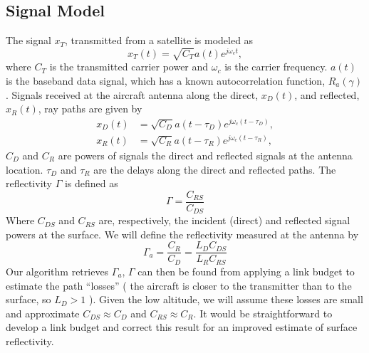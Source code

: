 \documentclass[draftcls,onecolumn]{IEEEtran}  %
\begin{document}
\subsection{Signal Model}
The  signal $x_{T}$, transmitted from a satellite is modeled as
\begin{equation}
	x_T(t)=\sqrt{C_T}a(t)e^{j\omega_et},
    \label{Eq:xT}
\end{equation}
where  $C_{T}$ is the transmitted carrier power and $\omega_{c}$ is the  carrier frequency. %
$a(t)$ is  the baseband data signal, which has  a known autocorrelation  function, $R_a(\gamma)$. 
Signals received at the aircraft antenna   along the direct, $x_D(t)$, and reflected, $x_R(t)$,  ray paths are given by 
\begin{eqnarray}
  	x_D(t)&=\sqrt{C_D}a(t-\tau_D)e^{j\omega_c (t-\tau_D)}, \\
    x_R(t)&=\sqrt{C_R}a(t-\tau_R)e^{j\omega_c (t-\tau_R)}, 
    \label{Eq:xD_xR}
\end{eqnarray}
 $C_D$ and $C_R$ are  powers of signals the direct and reflected signals at the antenna location.  
$\tau_D$ and $\tau_R$ are the  delays along the direct and reflected paths. 
The reflectivity $\Gamma$ is defined as
\begin{equation}
	\Gamma=\frac{C_{RS}}{C_{DS}}
    \label{Eq:reflect}
\end{equation}
Where $C_{DS}$ and $C_{RS}$ are, respectively, the incident (direct) and reflected signal powers at the surface. 
We will define  the reflectivity measured  at the antenna by 
\begin{equation}
\Gamma_a = \frac{C_R}{C_D} = \frac{L_D C_{DS}} {L_R C_{RS}}
\end{equation}
Our algorithm  retrieves $\Gamma_a$,  $\Gamma$ can then be found from applying a link budget to estimate the path ``losses''  ( the aircraft is closer to the transmitter than to the surface, so $L_D > 1$ ). 
Given the low altitude, we will assume these losses are small and approximate $C_{DS}\approx C_D$ and $C_{RS}\approx C_R$. 
It would be straightforward to develop a link budget and correct this result for an improved estimate of surface reflectivity. 
\end{document}
